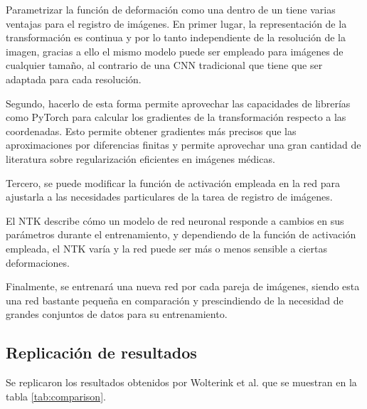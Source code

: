 Parametrizar la función de deformación como una  dentro de un  tiene varias ventajas para el registro de imágenes.
En primer lugar, la representación de la transformación es continua y por lo tanto independiente de la resolución de la imagen,
gracias a ello el mismo modelo puede ser empleado para imágenes de cualquier tamaño, al contrario de una CNN tradicional
que tiene que ser adaptada para cada resolución.

Segundo, hacerlo de esta forma permite aprovechar las capacidades de librerías como PyTorch para calcular los gradientes de la transformación respecto a las coordenadas.
Esto permite obtener gradientes más precisos que las aproximaciones por diferencias finitas
y permite aprovechar una gran cantidad de literatura sobre regularización eficientes en imágenes médicas.

Tercero, se puede modificar la función de activación empleada en la red para ajustarla a las necesidades particulares de la tarea de registro de imágenes.

El \gls{NTK} describe cómo un modelo de red neuronal responde a cambios en sus parámetros durante el entrenamiento,
y dependiendo de la función de activación empleada, el NTK varía y la red puede ser más o menos sensible a ciertas deformaciones.

Finalmente, se entrenará una nueva red por cada pareja de imágenes, siendo esta una red bastante pequeña en comparación y prescindiendo de la necesidad de grandes conjuntos de datos para su entrenamiento.

\subsection{Replicación de resultados}
\label{subsec:Replicación de resultados}

Se replicaron los resultados obtenidos por Wolterink et al. \cite{wolterink2021implicit} que se muestran en la tabla \ref{tab:comparison}.

